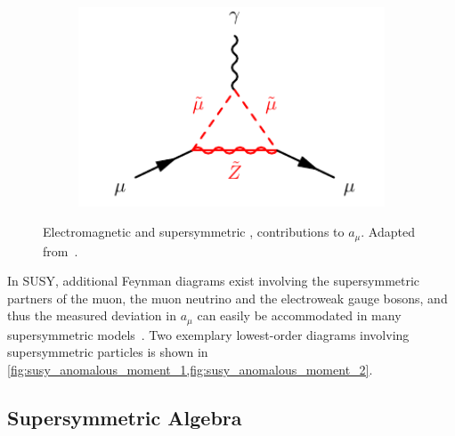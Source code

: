 \begin{figure}
\begin{subfigure}[b]{0.33\linewidth}
		\caption{\label{fig:susy_anomalous_moment_1}}
	\end{subfigure}%
	\begin{subfigure}[b]{0.33\linewidth}
		\centering\includegraphics[width=1.0\textwidth]{susy_anomalous_moment_2}
		\caption{\label{fig:susy_anomalous_moment_2}}
	\end{subfigure}	
	\caption{Electromagnetic  and supersymmetric ,  contributions to $a_\mu$. Adapted from~\cite{baer_tata_2006}.}\label{fig:loop_corrections_anomalous_moment}
\end{figure}

In SUSY, additional Feynman diagrams exist involving the supersymmetric partners of the muon, the muon neutrino and the electroweak gauge bosons, and thus the measured deviation in $a_\mu$ can easily be accommodated in many supersymmetric models~\cite{Czarnecki:2001pv,Feng:2001tr}. Two exemplary lowest-order diagrams involving supersymmetric particles is shown in \cref{fig:susy_anomalous_moment_1,fig:susy_anomalous_moment_2}.


\subsection{Supersymmetric Algebra}\label{sec:susy_algebra}

